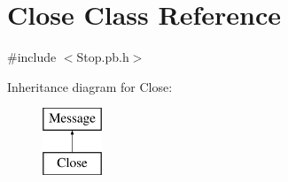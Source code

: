 \hypertarget{class_close}{\section{Close Class Reference}
\label{class_close}
}


{\ttfamily \#include $<$Stop.\-pb.\-h$>$}

Inheritance diagram for Close\-:\begin{figure}[H]
\begin{center}
\leavevmode
\includegraphics[height=2.000000cm]{class_close}
\end{center}
\end{figure}
